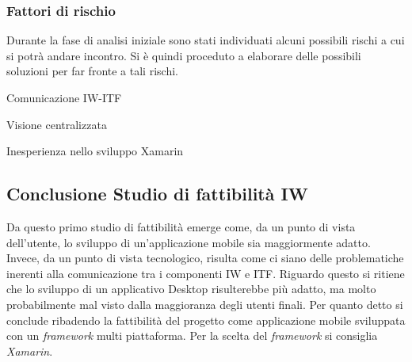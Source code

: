 \subsubsection{Fattori di rischio}
Durante la fase di analisi iniziale sono stati individuati alcuni possibili rischi a cui si potrà andare incontro.
Si è quindi proceduto a elaborare delle possibili soluzioni per far fronte a tali rischi.\\


\begin{risk}{Comunicazione IW-ITF}
    \label{risk:comunication-iw-itf} 
\end{risk}
\begin{risk}{Visione centralizzata}
    \label{risk:centralization-vision-from-user} 
\end{risk}
\begin{risk}{Inesperienza nello sviluppo Xamarin}
    \label{risk:centralization-vision-from-user} 
\end{risk}
\subsection{Conclusione Studio di fattibilità IW}
Da questo primo studio di fattibilità emerge come, da un punto di vista dell’utente, lo sviluppo di un’applicazione mobile sia maggiormente adatto. Invece, da un punto di vista tecnologico, risulta come ci siano delle problematiche inerenti alla comunicazione tra i componenti IW e ITF. Riguardo questo si ritiene che lo sviluppo di un applicativo Desktop risulterebbe più adatto, ma molto probabilmente mal visto dalla maggioranza degli utenti finali. 
Per quanto detto si conclude ribadendo la fattibilità del progetto come applicazione mobile sviluppata con un \emph{framework} multi piattaforma. Per la scelta del \emph{framework} si consiglia \emph{Xamarin}.
